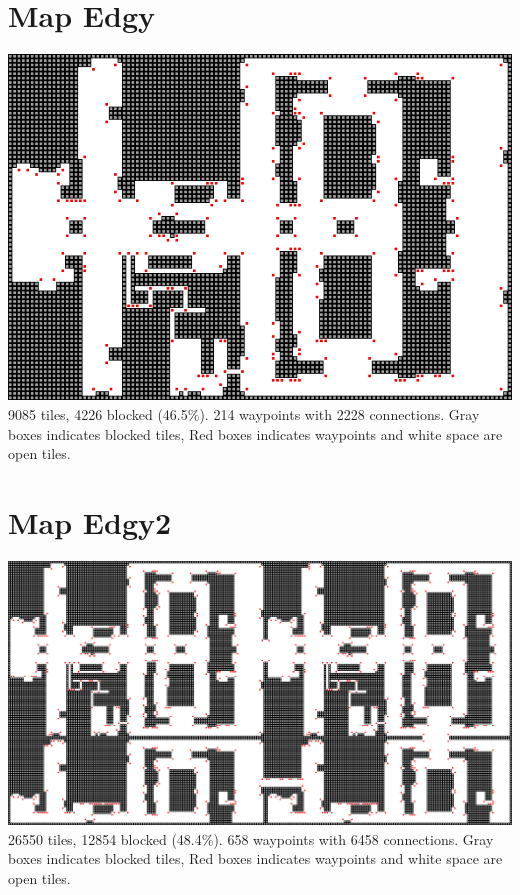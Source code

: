\documentclass[a4paper]{article}
\begin{document}
{\begin{thebibliography}{9}
\end{thebibliography}

\clearpage
\onecolumn
\appendix
\appendixpage
\addappheadtotoc

\section{Map Edgy}\label{ap.edgy}
\centering
\includegraphics[width=\textwidth,height=\textheight,keepaspectratio]{ChartsAndFigures/Edgy.png}
9085 tiles, 4226 blocked (46.5\%). 214 waypoints with 2228 connections. Gray boxes indicates blocked tiles, Red boxes indicates waypoints and white space are open tiles.

\flushleft
\pagebreak
\section{Map Edgy2}\label{ap.edgy2}
\centering
\includegraphics[width=\textwidth,height=\textheight,keepaspectratio]{ChartsAndFigures/Edgy2.png}
26550 tiles, 12854 blocked (48.4\%). 658 waypoints with 6458 connections. Gray boxes indicates blocked tiles, Red boxes indicates waypoints and white space are open tiles.

}
\end{document}
